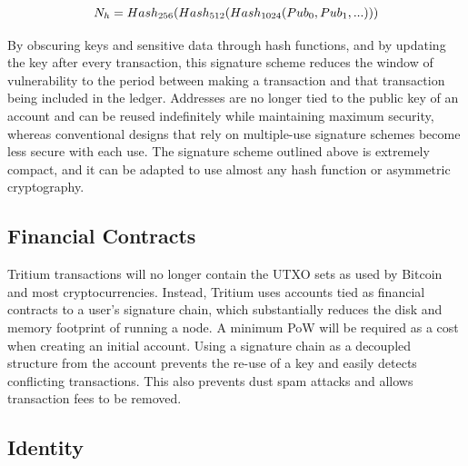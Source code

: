 \documentclass[11pt]{article}
\begin{document}
\begin{equation}
\label{eq:NextHash in Chain}
\resizebox{.65\hsize}{!}
{$
N_{h} = Hash_{256}( Hash_{512}( Hash_{1024} ( Pub_{0}, Pub_{1}, ...)))
$}
\end{equation}

\noindent By obscuring keys and sensitive data through hash functions, and by updating the key after every transaction, this signature scheme reduces the window of vulnerability to the period between making a transaction and that transaction being included in the ledger. 
Addresses are no longer tied to the public key of an account and can be reused indefinitely while maintaining maximum security, whereas conventional designs that rely on multiple-use signature schemes become less secure with each use.
The signature scheme outlined above is extremely compact, and it can be adapted to use almost any hash function or asymmetric cryptography.

\subsection{Financial Contracts}

Tritium transactions will no longer contain the UTXO sets as used by Bitcoin and most cryptocurrencies.
Instead, Tritium uses accounts tied as financial contracts to a user's signature chain, which substantially reduces the disk and memory footprint of running a node.
A minimum PoW will be required as a cost when creating an initial account.
Using a signature chain as a decoupled structure from the account prevents the re-use of a key and easily detects conflicting transactions.
This also prevents dust spam attacks and allows transaction fees to be removed.

\subsection{Identity}
\end{document}
